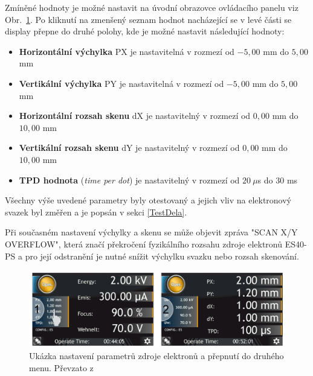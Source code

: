 Zmíněné hodnoty je možné nastavit na úvodní obrazovce ovládacího panelu viz Obr.~\ref{04display}. Po kliknutí na zmenšený seznam hodnot nacházející se v levé části se display přepne do druhé polohy, kde je možné nastavit následující hodnoty:
\begin{itemize}
\item \textbf{Horizontální výchylka} PX je nastavitelná v rozmezí od $-5{,}00$ mm do $5{,}00$ mm 
\item \textbf{Vertikální výchylka} PY je nastavitelná v rozmezí od $-5{,}00$ mm do $5{,}00$ mm 
\item \textbf{Horizontální rozsah skenu} dX je nastavitelný v rozmezí od $0{,}00$ mm do $10{,}00$ mm
\item \textbf{Vertikální rozsah skenu} dY je nastavitelný v rozmezí od $0{,}00$ mm do $10{,}00$ mm
\item \textbf{TPD hodnota} (\textit{time per dot}) je nastavitelný v rozmezí od $20 \ \mu$s  do $30$ ms
\end{itemize}

Všechny výše uvedené parametry byly otestovaný a jejich vliv na elektronový svazek byl změřen a je popsán v sekci \ref{TestDela}.

Při současném nastavení výchylky a skenu se může objevit zpráva "SCAN X/Y OVERFLOW", která značí překročení fyzikálního rozsahu zdroje elektronů ES40-PS a pro její odstranění je nutné snížit výchylku svazku nebo rozsah skenování. 

\begin{figure}[htbp!]
\centering
\includegraphics[width = 370 pt]{Figure/04/display.png}
\caption[Ukázka nastavení parametrů zdroje elektronů]{Ukázka nastavení parametrů zdroje elektronů a přepnutí do druhého menu. Převzato z~\cite{Manual}}
\label{04display}
\end{figure}

%

